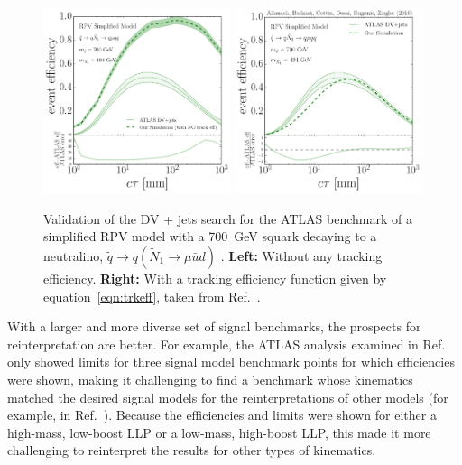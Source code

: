 \begin{figure}[t]
\begin{center}
\includegraphics[width=0.49\textwidth,angle=0]{ch5-figures/effVsCtau_RPVValidation_NoTrkEff.pdf}
\includegraphics[width=0.49\textwidth,angle=0]{ch5-figures/effVsCtau_RPVValidation.pdf}
\end{center}
\caption{Validation of the DV + jets search for the ATLAS benchmark of a simplified RPV model with a 700~GeV squark decaying to a neutralino, $\tilde q \rightarrow q (\tilde N_{1} \rightarrow \mu \bar u d)$ \label{fig:trkeff}. {\bf{Left:}} Without any tracking efficiency. {\bf{Right:}} With a tracking efficiency function given by equation~\ref{eqn:trkeff}, taken from Ref.~\cite{Allanach:2016pam}.}
\end{figure}

\vskip 0.1in
\vskip 0.1in

With a larger and more diverse set of signal benchmarks, the prospects for reinterpretation are better. For example, the ATLAS analysis examined in Ref.~\cite{ATLAS-CONF-2013-092} only showed limits for three signal model benchmark points for which efficiencies were shown, making it challenging to find a benchmark whose kinematics matched the desired signal models for the reinterpretations of other models (for example, in Ref.~\cite{Cui:2014twa}). Because the efficiencies and limits were shown for either a high-mass, low-boost LLP or a low-mass, high-boost LLP, this made it more challenging to reinterpret the results for other types of kinematics.

